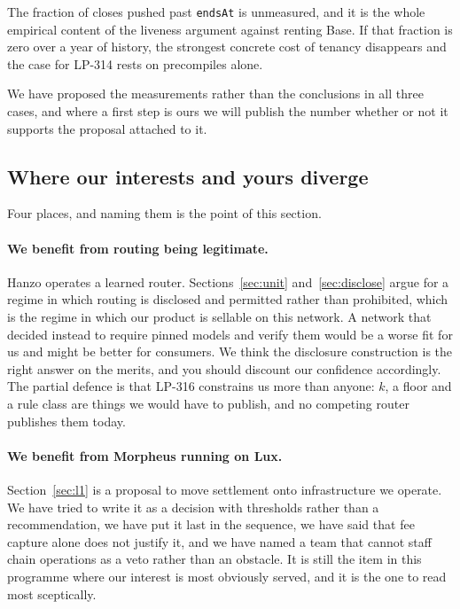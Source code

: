 \documentclass[11pt,a4paper]{article}
\newcommand{\code}[1]{\texttt{\small #1}}
\begin{document}
The fraction of closes pushed past \code{endsAt} is unmeasured, and it is the
whole empirical content of the liveness argument against renting Base. If that
fraction is zero over a year of history, the strongest concrete cost of tenancy
disappears and the case for LP-314 rests on precompiles alone.

We have proposed the measurements rather than the conclusions in all three
cases, and where a first step is ours we will publish the number whether or not
it supports the proposal attached to it.

\subsection{Where our interests and yours diverge}

Four places, and naming them is the point of this section.

\paragraph{We benefit from routing being legitimate.} Hanzo operates a learned
router. Sections~\ref{sec:unit} and~\ref{sec:disclose} argue for a regime in
which routing is disclosed and permitted rather than prohibited, which is the
regime in which our product is sellable on this network. A network that decided
instead to require pinned models and verify them would be a worse fit for us and
might be better for consumers. We think the disclosure construction is the right
answer on the merits, and you should discount our confidence accordingly. The
partial defence is that LP-316 constrains us more than anyone: $k$, a floor and
a rule class are things we would have to publish, and no competing router
publishes them today.

\paragraph{We benefit from Morpheus running on Lux.} Section~\ref{sec:l1} is a
proposal to move settlement onto infrastructure we operate. We have tried to
write it as a decision with thresholds rather than a recommendation, we have put
it last in the sequence, we have said that fee capture alone does not justify it,
and we have named a team that cannot staff chain operations as a veto rather
than an obstacle. It is still the item in this programme where our interest is
most obviously served, and it is the one to read most sceptically.
\end{document}
